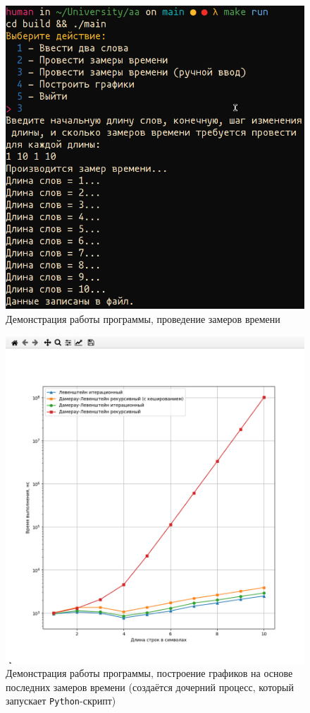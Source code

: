 \begin{figure}[H]
	\centering
	\includegraphics[scale=0.7]{img/demo2.png}
	\caption{Демонстрация работы программы, проведение замеров времени}
	\label{fig:demo2}
\end{figure}

\begin{figure}[H]
	\centering
	\includegraphics[scale=0.5]{img/demo3.png}
	\caption{Демонстрация работы программы, построение графиков на основе последних замеров времени (создаётся дочерний процесс, который запускает \texttt{Python}-скрипт)}
	\label{fig:demo3}
\end{figure}


